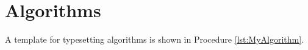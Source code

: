 









\chapter{Algorithms}
\label{chp:Algorithms}

A template for typesetting algorithms is shown in {\sc Procedure} \ref{lst:MyAlgorithm}.

